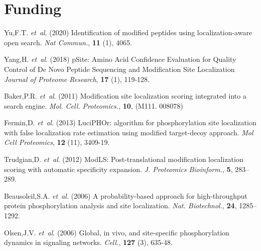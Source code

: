 \documentclass{bioinfo}
\begin{document}

\section*{Funding}


%
%
%
%
%
%
%
%
%


\begin{thebibliography}{}

Yu,F.T. {\it et~al}. (2020) Identification of modified peptides using localization-aware open search. {\it Nat Commun.}, {\bf 11} (1), 4065.

Yang,H. {\it et~al}. (2018) pSite: Amino Acid Confidence Evaluation for Quality Control of De Novo Peptide Sequencing and Modification Site Localization {\it Journal of Proteome Research}, {\bf 17} (1), 119-128.

Baker,P.R. {\it et~al}. (2011) Modification site localization scoring integrated into a search engine.
{\it Mol. Cell. Proteomics.}, {\bf 10}, (M111. 008078)

Fermin,D. {\it et~al}. (2013) LuciPHOr: algorithm for phosphorylation site localization with false localization rate estimation using modified target-decoy approach. {\it Mol Cell Proteomics}, {\bf 12} (11), 3409-19.

Trudgian,D. {\it et~al}. (2012) ModLS: Post-translational modification localization scoring with automatic specificity expansion. {\it J. Proteomics Bioinform.}, {\bf 5}, 283–289.

Beausoleil,S.A. {\it et~al}. (2006) A probability-based approach for high-throughput protein phosphorylation analysis and site localization. {\it Nat. Biotechnol.}, {\bf 24}, 1285–1292.

Olsen,J.V. {\it et~al}. (2006) Global, in vivo, and site-specific phosphorylation dynamics in signaling networks. {\it Cell.}, {\bf 127} (3), 635-48.




\end{thebibliography}
\end{document}
